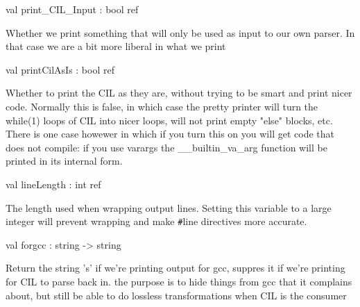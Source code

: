 \documentclass[11pt]{article}
\begin{document}
\label{val:Cil.print-underscoreCIL-underscoreInput}\begin{ocamldoccode}
val print_CIL_Input : bool ref
\end{ocamldoccode}
\begin{ocamldocdescription}
Whether we print something that will only be used as input to our own 
 parser. In that case we are a bit more liberal in what we print


\end{ocamldocdescription}




\label{val:Cil.printCilAsIs}\begin{ocamldoccode}
val printCilAsIs : bool ref
\end{ocamldoccode}
\begin{ocamldocdescription}
Whether to print the CIL as they are, without trying to be smart and 
 print nicer code. Normally this is false, in which case the pretty 
 printer will turn the while(1) loops of CIL into nicer loops, will not 
 print empty "else" blocks, etc. There is one case howewer in which if you 
 turn this on you will get code that does not compile: if you use varargs 
 the \_\_builtin\_va\_arg function will be printed in its internal form.


\end{ocamldocdescription}




\label{val:Cil.lineLength}\begin{ocamldoccode}
val lineLength : int ref
\end{ocamldoccode}
\begin{ocamldocdescription}
The length used when wrapping output lines.  Setting this variable to
 a large integer will prevent wrapping and make \verb`#`line directives more
 accurate.


\end{ocamldocdescription}




\label{val:Cil.forgcc}\begin{ocamldoccode}
val forgcc : string -> string
\end{ocamldoccode}
\begin{ocamldocdescription}
Return the string 's' if we're printing output for gcc, suppres
  it if we're printing for CIL to parse back in.  the purpose is to
  hide things from gcc that it complains about, but still be able
  to do lossless transformations when CIL is the consumer


\end{ocamldocdescription}
\end{document}
